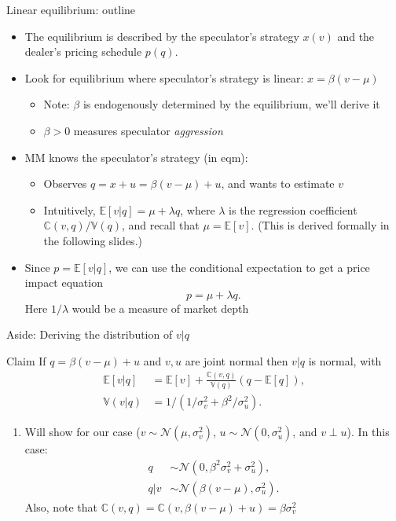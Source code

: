 \documentclass[english,10pt
,aspectratio=169
]{beamer}
\begin{document}
\begin{frame}{Linear equilibrium: outline}
\begin{itemize}
	\item The equilibrium is described by the speculator's strategy $x(v)$ and the dealer's pricing schedule $p(q)$.
	\pause
	\item Look for equilibrium where speculator's strategy is linear: \alert{$x=\beta(v-\mu)$}
	\begin{itemize}
		\item Note: $\beta$ is endogenously determined by the equilibrium, we'll derive it
		\item $\beta>0$ measures speculator \textit{aggression}
	\end{itemize}
	\item MM knows the speculator's strategy (in eqm):
	\begin{itemize}
		\item Observes $q=x+u=\beta(v-\mu)+u$, and wants to \alert{estimate $v$}
		\item Intuitively, \alert{$\mathbb{E}[v|q] = \mu + \lambda  q$}, where $\lambda $ is the regression coefficient $\mathbb{C}(v,q)/\mathbb{V}(q)$, and recall that $\mu=\mathbb{E}[v]$. (This is derived formally in the following slides.)
	\end{itemize}
	\item Since $p=\mathbb{E}[v|q]$, we can use the conditional expectation to get a price impact equation 
	\[
	p=\mu+\lambda q.
	\]
	Here $1/\lambda$ would be a measure of market depth
\end{itemize}
\end{frame}


\begin{frame}{Aside: Deriving the distribution of $v|q$}
	\begin{block}{Claim}
		If $q=\beta(v-\mu) + u$ and $v,u$ are joint normal then $v|q$ is normal, with
		\begin{align*}
			\mathbb{E}[v|q] &= \mathbb{E}[v] + \frac{\mathbb{C}(v,q)}{\mathbb{V}(q)} (q-\mathbb{E}[q]),
			\\
			\mathbb{V}(v|q) &= 1/(1/\sigma^2_v + \beta^2 / \sigma^2_u).
		\end{align*}
	\end{block}
	\begin{enumerate}
		\item Will show for our case ($v \sim \mathcal{N}(\mu, \sigma^2_v)$, $u \sim \mathcal{N}(0, \sigma^2_u)$, and $v \perp u$). In this case:
		\begin{align*}
			q    & \sim \mathcal{N}(0, \beta^2 \sigma^2_v+\sigma^2_u),
			\\
			q|v & \sim \mathcal{N}(\beta(v-\mu), \sigma^2_u).
		\end{align*}
		Also, note that $\mathbb{C}(v,q)= \mathbb{C}(v, \beta(v-\mu)+u)=\beta\sigma^2_v$
	\end{enumerate}
\end{frame}
\end{document}
